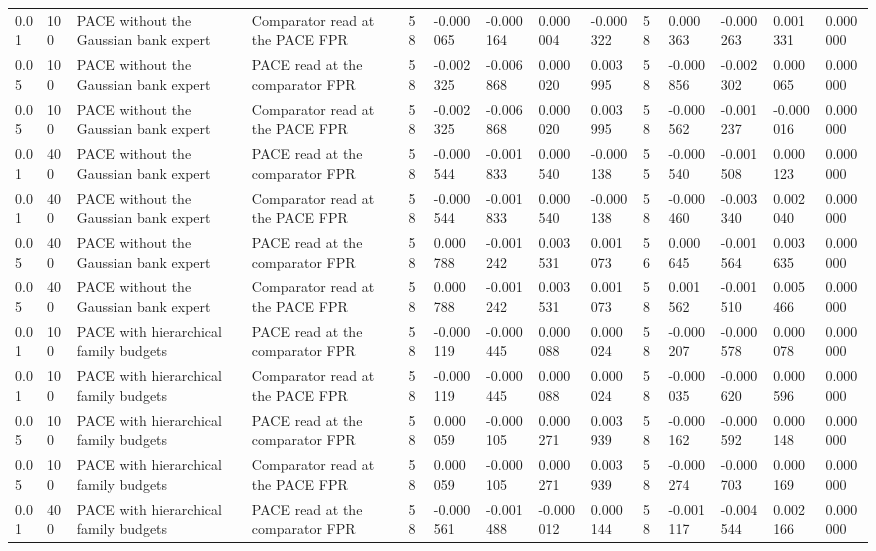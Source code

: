 \begin{tabular}{llllllllllllll}
0.01 & 100 & PACE without the Gaussian bank expert & Comparator read at the PACE FPR & 58 & -0.000065 & -0.000164 & 0.000004 & -0.000322 & 58 & 0.000363 & -0.000263 & 0.001331 & 0.000000 \\
0.05 & 100 & PACE without the Gaussian bank expert & PACE read at the comparator FPR & 58 & -0.002325 & -0.006868 & 0.000020 & 0.003995 & 58 & -0.000856 & -0.002302 & 0.000065 & 0.000000 \\
0.05 & 100 & PACE without the Gaussian bank expert & Comparator read at the PACE FPR & 58 & -0.002325 & -0.006868 & 0.000020 & 0.003995 & 58 & -0.000562 & -0.001237 & -0.000016 & 0.000000 \\
0.01 & 400 & PACE without the Gaussian bank expert & PACE read at the comparator FPR & 58 & -0.000544 & -0.001833 & 0.000540 & -0.000138 & 55 & -0.000540 & -0.001508 & 0.000123 & 0.000000 \\
0.01 & 400 & PACE without the Gaussian bank expert & Comparator read at the PACE FPR & 58 & -0.000544 & -0.001833 & 0.000540 & -0.000138 & 58 & -0.000460 & -0.003340 & 0.002040 & 0.000000 \\
0.05 & 400 & PACE without the Gaussian bank expert & PACE read at the comparator FPR & 58 & 0.000788 & -0.001242 & 0.003531 & 0.001073 & 56 & 0.000645 & -0.001564 & 0.003635 & 0.000000 \\
0.05 & 400 & PACE without the Gaussian bank expert & Comparator read at the PACE FPR & 58 & 0.000788 & -0.001242 & 0.003531 & 0.001073 & 58 & 0.001562 & -0.001510 & 0.005466 & 0.000000 \\
0.01 & 100 & PACE with hierarchical family budgets & PACE read at the comparator FPR & 58 & -0.000119 & -0.000445 & 0.000088 & 0.000024 & 58 & -0.000207 & -0.000578 & 0.000078 & 0.000000 \\
0.01 & 100 & PACE with hierarchical family budgets & Comparator read at the PACE FPR & 58 & -0.000119 & -0.000445 & 0.000088 & 0.000024 & 58 & -0.000035 & -0.000620 & 0.000596 & 0.000000 \\
0.05 & 100 & PACE with hierarchical family budgets & PACE read at the comparator FPR & 58 & 0.000059 & -0.000105 & 0.000271 & 0.003939 & 58 & -0.000162 & -0.000592 & 0.000148 & 0.000000 \\
0.05 & 100 & PACE with hierarchical family budgets & Comparator read at the PACE FPR & 58 & 0.000059 & -0.000105 & 0.000271 & 0.003939 & 58 & -0.000274 & -0.000703 & 0.000169 & 0.000000 \\
0.01 & 400 & PACE with hierarchical family budgets & PACE read at the comparator FPR & 58 & -0.000561 & -0.001488 & -0.000012 & 0.000144 & 58 & -0.001117 & -0.004544 & 0.002166 & 0.000000 \\

\end{tabular}
